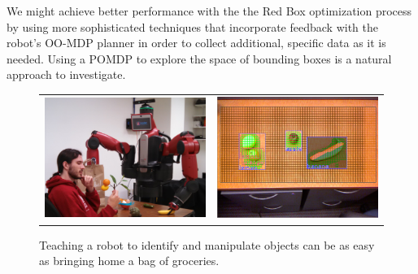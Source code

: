 \documentclass[12pt]{article}
\numberwithin{equation}{section}
\numberwithin{table}{section}
\numberwithin{figure}{section}
\begin{document}
We might achieve better performance with the the Red Box optimization process
by using more sophisticated techniques that incorporate feedback with the robot's OO-MDP planner in 
order to collect additional, specific data as it is needed.  
Using a POMDP \cite{POMDP} to explore the space of bounding boxes is a natural approach to investigate.

\begin{figure}
  \begin{center}
    \begin{tabular}{l c}
      \includegraphics[width=200px, height=150px]{robo2.png} &
      \includegraphics[width=200px, height=150px]{screen2.png} \\
    \end{tabular}
  \end{center}
  \caption{Teaching a robot to identify and manipulate objects can be as easy as bringing home
	    a bag of groceries.}
\end{figure}

\end{document}
